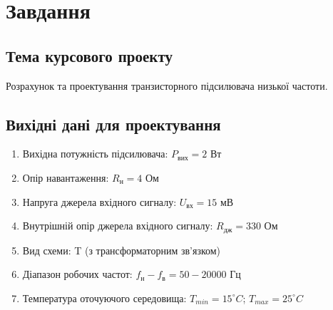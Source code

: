 \documentclass[main.tex]{subfiles}
\begin{document}
\newpage
\section{Завдання}

\subsection{Тема курсового проекту}
Розрахунок та проектування транзисторного підсилювача низької частоти.

\subsection{Вихідні дані для проектування}
\begin{enumerate}
    \item Вихідна потужність підсилювача: $P_\text{вих} = 2$ Вт
    \item Опір навантаження: $R_\text{н} = 4$ Ом
    \item Напруга джерела вхідного сигналу: $U_\text{вх} = 15$ мВ
    \item Внутрішній опір джерела вхідного сигналу: $R_{\text{дж}} = 330$ Ом
    \item Вид схеми: T (з трансформаторним зв'язком)
    \item Діапазон робочих частот: $f_{\text{н}} - f_{\text{в}} = 50 - 20000$ Гц
    \item Температура оточуючого середовища: $T_{min} = 15^\circ C$; $T_{max} = 25^\circ C$
\end{enumerate}
\end{document}

